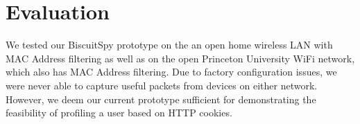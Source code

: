 \section{Evaluation}
\label{sec:eval}

We tested our BiscuitSpy prototype on the an open home wireless LAN with MAC Address filtering as well as on the open Princeton University WiFi network, which also has MAC Address filtering. Due to factory configuration issues, we were never able to capture useful packets from devices on either network. However, we deem our current prototype sufficient for demonstrating the feasibility of profiling a user based on HTTP cookies.